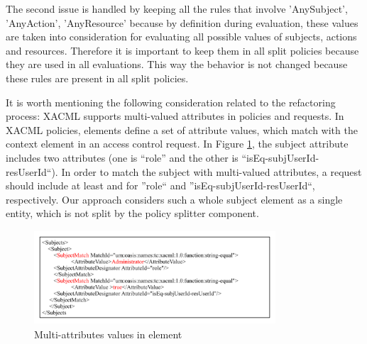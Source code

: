The second issue is handled by keeping all the rules that involve 'AnySubject', 'AnyAction', 'AnyResource' because by definition during 
evaluation, these values are taken into consideration for evaluating all possible values of subjects, actions and resources. 
Therefore it is important to keep them in all split policies because they are used in all evaluations. 
This way the behavior is not changed because these rules are present in all split policies. 




It is worth mentioning the following consideration related to the refactoring process:
XACML supports multi-valued attributes in policies and requests. In XACML policies,  elements define a set of attribute values, which match with the context element in 
an access control request. In Figure \ref{xacml-match}, the subject attribute includes two attributes (one is ``role'' and the other 
is ``isEq-subjUserId-resUserId``). In order to match the subject with multi-valued attributes, a request should include at least  and  for ''role`` and ''isEq-subjUserId-resUserId``, respectively.
Our approach considers such a whole subject element as a single entity, which is not split by the policy splitter component.
\begin{figure}[!h]
\begin{center}
\includegraphics[width=9cm, height=3.5cm]{xacml-match}
\caption{Multi-attributes values in  element}
\label{xacml-match}
\end{center}
\end{figure}

